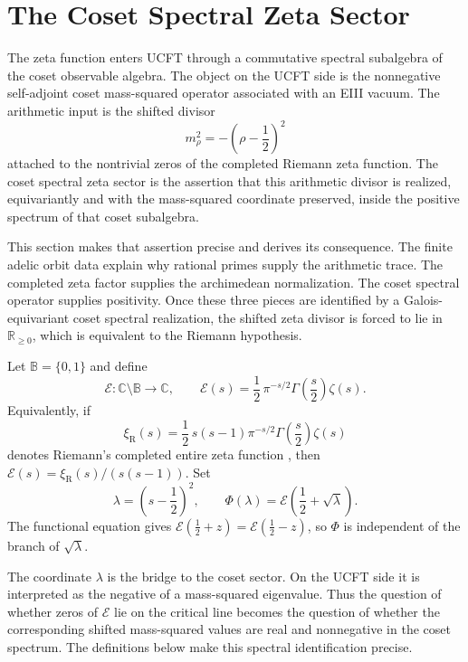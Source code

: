 \documentclass[pdflatex,sn-mathphys-num]{sn-jnl}
\theoremstyle{thmstyleone}
\theoremstyle{thmstylethree}%
\theoremstyle{thmstyletwo}%
\begin{document}
\section{The Coset Spectral Zeta Sector}
\label{sec:ZetaSector}

The zeta function enters UCFT through a commutative spectral subalgebra of the
coset observable algebra. The object on the UCFT side is the nonnegative
self-adjoint coset mass-squared operator associated with an EIII vacuum. The
arithmetic input is the shifted divisor
\[
  m_\rho^2=-\left(\rho-\frac12\right)^2
\]
attached to the nontrivial zeros of the completed Riemann zeta function. The
coset spectral zeta sector is the assertion that this arithmetic divisor is
realized, equivariantly and with the mass-squared coordinate preserved, inside
the positive spectrum of that coset subalgebra.

This section makes that assertion precise and derives its consequence. The
finite adelic orbit data explain why rational primes supply the arithmetic
trace. The completed zeta factor supplies the archimedean normalization. The
coset spectral operator supplies positivity. Once these three pieces are
identified by a Galois-equivariant coset spectral realization, the shifted
zeta divisor is forced to lie in \(\mathbb R_{\ge0}\), which is equivalent to
the Riemann hypothesis.

Let \(\mathbb B=\{0,1\}\) and define
\[
  \mathcal E:\mathbb C\setminus\mathbb B\longrightarrow\mathbb C,
  \qquad
  \mathcal E(s)
  =
  \frac12\,\pi^{-s/2}\Gamma\left(\frac{s}{2}\right)\zeta(s).
\]
Equivalently, if
\[
  \xi_{\mathrm R}(s)
  =
  \frac12\,s(s-1)\pi^{-s/2}\Gamma\left(\frac{s}{2}\right)\zeta(s)
\]
denotes Riemann's completed entire zeta function
\cite{Riemann1859,Edwards1974,Titchmarsh1986}, then
\(\mathcal E(s)=\xi_{\mathrm R}(s)/(s(s-1))\). Set
\[
  \lambda=\left(s-\frac12\right)^2,
  \qquad
  \Phi(\lambda)
  =
  \mathcal E\left(\frac12+\sqrt{\lambda}\right).
\]
The functional equation gives
\(\mathcal E(\frac12+z)=\mathcal E(\frac12-z)\), so \(\Phi\) is independent of
the branch of \(\sqrt{\lambda}\).

The coordinate \(\lambda\) is the bridge to the coset sector. On the UCFT side
it is interpreted as the negative of a mass-squared eigenvalue. Thus the
question of whether zeros of \(\mathcal E\) lie on the critical line becomes
the question of whether the corresponding shifted mass-squared values are real
and nonnegative in the coset spectrum. The definitions below make
this spectral identification precise.
\end{document}
